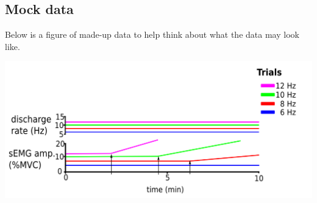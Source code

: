 \subsection{Mock data}
Below is a figure of made-up data to help think about what the data may look like. 

\includegraphics[scale=0.75]{./img/fake_data.png} 

\lipsum[1]